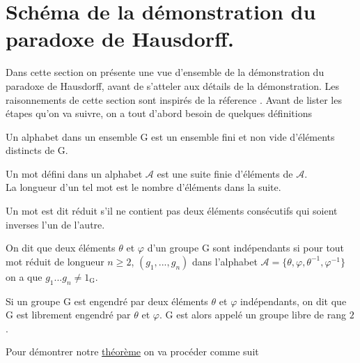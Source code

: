 \section{Schéma de la démonstration du paradoxe de Hausdorff.}
\noindent
Dans cette section on présente une vue d'ensemble de la démonstration du paradoxe de Hausdorff, avant de s'atteler aux détails de la démonstration.
Les raisonnements de cette section sont inspirés de la réference \cite{cite2}.
Avant de lister les étapes qu'on va suivre, on a tout d'abord besoin de quelques définitions
\begin{definition}
  Un alphabet dans un ensemble $\mathrm{G}$ est un ensemble fini et non vide d'éléments distincts de $\mathrm{G}$.
\end{definition}
\begin{definition}
  Un mot défini dans un alphabet $\mathcal{A}$ est une suite finie d'éléments de $\mathcal{A}$.\\ La longueur d'un tel mot est le nombre d'éléments dans la suite.
\end{definition}
\begin{definition}
Un mot est dit réduit s'il ne contient pas deux éléments consécutifs qui soient inverses l'un de l'autre.
\end{definition}
\begin{definition}
  On dit que deux éléments $\theta$ et $\varphi$ d’un groupe $\mathrm{G}$ sont indépendants si pour tout mot réduit de longueur $n\ge 2$, $(g_1, ..., g_n)$ dans l'alphabet $\mathcal{A} = \{\theta, \varphi, \theta^{-1}, \varphi^{-1}\}$ on a que $g_1...g_n \ne 1_\mathrm{G}$.
\end{definition}
\begin{definition}
Si un groupe $\mathrm{G}$ est engendré par deux éléments $\theta$ et $\varphi$ indépendants, on dit
que $\mathrm{G}$ est librement engendré par $\theta$ et $\varphi$. $\mathrm{G}$ est alors appelé un groupe libre de rang $2$.
\end{definition}
\noindent
Pour démontrer notre \hyperref[But]{théorème} on va procéder comme suit
